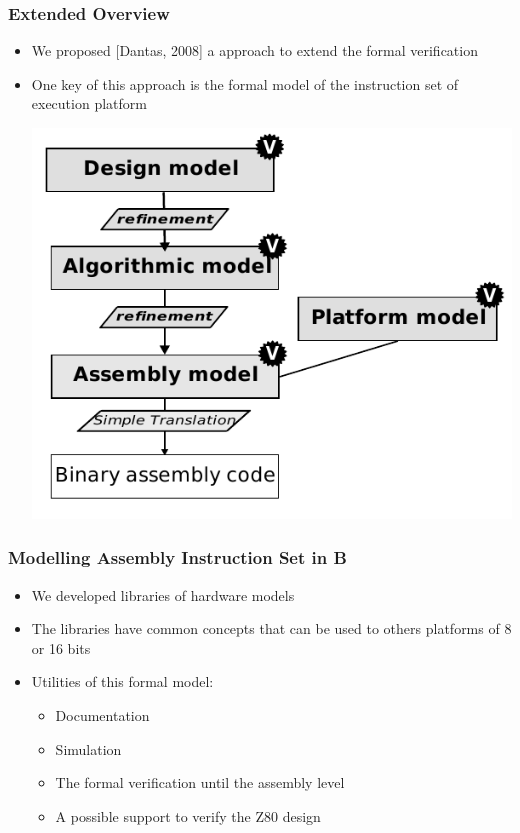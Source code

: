 \begin{frame}
\frametitle{Extended Overview}  

\begin{itemize}[<+->]
    \item We proposed [Dantas, 2008]  a approach to extend the formal verification
    \item One key of this approach is the formal model of the instruction set  of execution platform %
      \\ \begin{center} \includegraphics[height=.5\textheight]{figures/b-method-ideal_new.pdf} \end{center}
  

\end{itemize}

\end{frame}


\begin{frame}
\frametitle{Modelling Assembly Instruction Set in B}  

\begin{itemize}[<+->]
  \item We developed libraries of hardware models%
  \item The libraries have common concepts that can be used to others platforms of 8 or 16 bits
  \item Utilities of this formal model:
  \begin{itemize}
    \item Documentation
    \item Simulation
    \item The formal verification until the assembly level
    \item A possible support to verify the Z80 design

  \end{itemize}
\end{itemize}

\end{frame}


